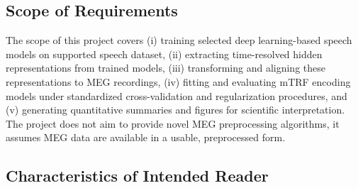 \documentclass[12pt]{article}
\begin{document}
\subsection{Scope of Requirements} 





The scope of this project covers (i) training selected deep learning-based speech models on supported speech dataset, (ii) extracting time-resolved hidden representations
from trained models, (iii) transforming and aligning these representations to MEG recordings, (iv) fitting and evaluating mTRF encoding models under standardized cross-validation and regularization procedures, and (v) generating quantitative summaries and figures for scientific interpretation.
The project does not aim to provide novel MEG preprocessing algorithms, it assumes MEG data are available in a usable, preprocessed form.





\subsection{Characteristics of Intended Reader} \label{sec_IntendedReader}
\end{document}
